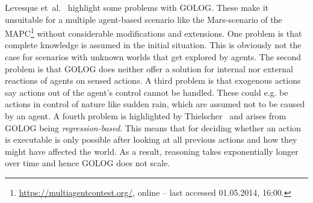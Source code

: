 Levesque et~al.~\cite{levesque_golog:_1997} highlight some problems with GOLOG. These make it unsuitable for a multiple agent-based scenario like the Mars-scenario of the MAPC\footnote{\url{https://multiagentcontest.org/}, online -- last accessed 01.05.2014, 16:00.} without considerable modifications and extensions. One problem is that complete knowledge is assumed in the initial situation. This is obviously not the case for scenarios with unknown worlds that get explored by agents. The second problem is that GOLOG does neither offer a solution for internal nor external reactions of agents on sensed actions. A third problem is that exogenous actions say actions out of the agent's control cannot be handled. These could e.g. be actions in control of nature like sudden rain, which are assumed not to be caused by an agent. A fourth problem is highlighted by Thielscher~\cite{thielscher_flux:_2005} and arises from GOLOG being \emph{regression-based}. This means that for deciding whether an action is executable is only possible after looking at all previous actions and how they might have affected the world. As a result, reasoning takes exponentially longer over time and hence GOLOG does not scale.
